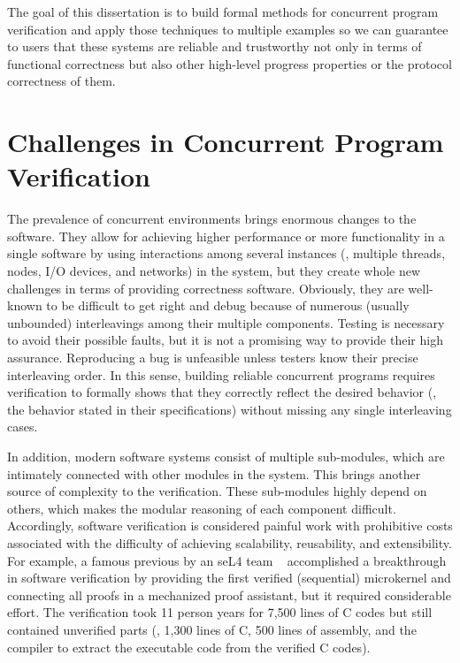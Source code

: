 The goal of this dissertation is to build formal methods for concurrent program verification and apply those techniques to 
multiple examples so we can guarantee to users that these systems are reliable and trustworthy not only in terms of functional correctness 
but also other high-level progress properties or the protocol correctness of them.


\section{Challenges in Concurrent Program Verification}
\label{chapter:introduction:sec:challenges-in-concurrent-program-verification}

The prevalence of concurrent environments brings enormous changes to the software. 
They allow for achieving higher performance or more functionality in a single software by using interactions among several instances 
(\ie, multiple threads, nodes, I/O devices, and networks) in the system, 
but they create whole new challenges in terms of providing correctness software. 
Obviously, they are well-known to be difficult to get right and debug because of numerous (usually unbounded)
 interleavings among their multiple components. Testing is necessary to avoid their possible faults, 
 but it is not a promising way to provide their high assurance. Reproducing a bug is unfeasible unless testers know their precise interleaving order.
In this sense, building reliable concurrent programs requires verification to formally shows that they 
correctly reflect the desired behavior (\ie, the behavior stated in their specifications) without missing any single interleaving cases.


In addition, modern software systems consist of multiple sub-modules, 
which are intimately connected with other modules in the system. This brings another source of complexity to the verification. 
These sub-modules highly depend on others, which makes the modular reasoning of each component difficult. 
Accordingly, software verification is considered painful work with prohibitive costs associated with the difficulty of achieving scalability, 
reusability,  and extensibility. 
For example, a famous previous by an seL4 team ~\cite{klein2009sel4} accomplished a breakthrough in software verification 
by providing the first verified (sequential) microkernel and connecting all proofs in a mechanized proof assistant, 
but it required considerable effort. The verification took 11 person years for 7,500 lines of C codes but still contained unverified parts
 (\ie, 1,300 lines of C, 500 lines of assembly, and the compiler to extract the executable code from the verified C codes).



